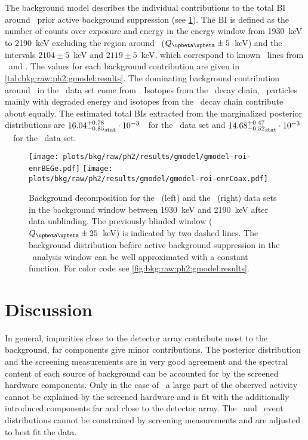 The background model describes the individual contributions to the total BI around \qbb\
prior active background suppression (see \cref{fig:bkg:raw:ph2:gmodel:results:roi}).
The BI is defined as the number of counts over exposure and energy in the energy window
from 1930~keV to 2190~keV excluding the region around \qbb\ ($\qbbM \pm 5$~keV) and the
intervals $2104 \pm 5$~keV and $2119 \pm 5$~keV, which correspond to known \g\ lines from
\Tl\ and \Bih. The values for each background contribution are given in
\cref{tab:bkg:raw:ph2:gmodel:results}. The dominating background contribution around \qbb\
in the \enrBEGeII\ data set come from \kvz. Isotopes from the \Thh\ decay chain, \a\
particles mainly with degraded energy and isotopes from the \Uh\ decay chain contribute
about equally. The estimated total BIs extracted from the marginalized posterior
distributions are ${16.04^{+0.78}_{-0.85}}_\text{stat} \cdot 10^{-3}$~\ctsper\ for the
\enrBEGeII\ data set and ${14.68^{+0.47}_{-0.52}}_\text{stat} \cdot 10^{-3}$~\ctsper\ for the
\enrCoaxII\ data set.

\begin{figure}
  \centering
  \texttt{[image: plots/bkg/raw/ph2/results/gmodel/gmodel-roi-enrBEGe.pdf]}
  \hspace{12pt}
  \texttt{[image: plots/bkg/raw/ph2/results/gmodel/gmodel-roi-enrCoax.pdf]}
  \caption{%
    Background decomposition for the \enrBEGeII\ (left) and the \enrCoaxII\ (right) data
    sets in the background window between 1930~keV and 2190~keV after data unblinding. The
    previously blinded window ($\qbbM \pm 25$~keV) is indicated by two dashed lines.  The
    background distribution before active background suppression in the \onbb\ analysis
    window can be well approximated with a constant function. For color code see
    \cref{fig:bkg:raw:ph2:gmodel:results}.%
  }\label{fig:bkg:raw:ph2:gmodel:results:roi}
\end{figure}

\section{Discussion}%
\label{sec:bkg:raw:ph2:discussion}

In general, impurities close to the detector array contribute most to the background, far
components give minor contributions. The posterior distribution and the screening
measurements are in very good agreement and the spectral content of each source of
background can be accounted for by the screened hardware components. Only in the case of
\kvn\ a large part of the observed activity cannot be explained by the screened hardware
and is fit with the additionally introduced components far and close to the detector
array. The \kvz\ and \a\ event distributions cannot be constrained by screening
measurements and are adjusted to best fit the data.

